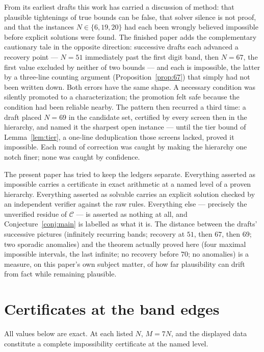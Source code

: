 \documentclass[11pt]{article}
\theoremstyle{definition}
\theoremstyle{remark}
\begin{document}
From its earliest drafts this work has carried a discussion of method: that plausible tightenings of true bounds can be false, that solver silence is not proof, and that the instances $N\in\{6,19,20\}$ had each been wrongly believed impossible before explicit solutions were found. The finished paper adds the complementary cautionary tale in the opposite direction: successive drafts each advanced a recovery point --- $N=51$ immediately past the first digit band, then $N=67$, the first value excluded by neither of two bounds --- and each is impossible, the latter by a three-line counting argument (Proposition~\ref{prop:67}) that simply had not been written down. Both errors have the same shape. A necessary condition was silently promoted to a characterization; the promotion felt safe because the condition had been reliable nearby. The pattern then recurred a third time: a draft placed $N=69$ in the candidate set, certified by every screen then in the hierarchy, and named it the sharpest open instance --- until the tier bound of Lemma~\ref{lem:tier}, a one-line deduplication those screens lacked, proved it impossible. Each round of correction was caught by making the hierarchy one notch finer; none was caught by confidence.

The present paper has tried to keep the ledgers separate. Everything asserted as impossible carries a certificate in exact arithmetic at a named level of a proven hierarchy. Everything asserted as solvable carries an explicit solution checked by an independent verifier against the raw rules. Everything else --- precisely the unverified residue of $\mathcal{C}$ --- is asserted as nothing at all, and Conjecture~\ref{conj:main} is labelled as what it is. The distance between the drafts' successive pictures (infinitely recurring bands; recovery at $51$, then $67$, then $69$; two sporadic anomalies) and the theorem actually proved here (four maximal impossible intervals, the last infinite; no recovery before $70$; no anomalies) is a measure, on this paper's own subject matter, of how far plausibility can drift from fact while remaining plausible.

\appendix

\section{Certificates at the band edges}\label{app:certs}

All values below are exact. At each listed $N$, $M=7N$, and the displayed data constitute a complete impossibility certificate at the named level.
\end{document}
